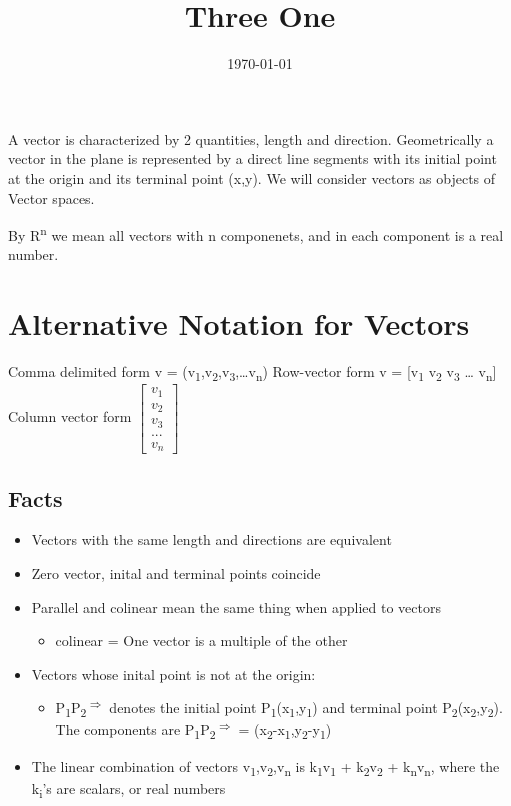 \documentclass[11pt]{article}
\date{\today}
\title{Three One}
\begin{document}
\maketitle
\tableofcontents

A vector is characterized by 2 quantities, length and direction. Geometrically a vector in the plane is represented by a direct line segments with its initial point at the origin and its terminal point (x,y). We will consider vectors as objects of Vector spaces.

By R\textsuperscript{n} we mean all vectors with n componenets, and in each component is a real number.
\section{Alternative Notation for Vectors}
\label{sec:org7187a6c}
Comma delimited form v = (v\textsubscript{1},v\textsubscript{2},v\textsubscript{3},\ldots{}v\textsubscript{n})
Row-vector form v = [v\textsubscript{1} v\textsubscript{2} v\textsubscript{3} \ldots{} v\textsubscript{n}]
Column vector form \(\begin{bmatrix}v_{1}\\v_{2}\\v_{3}\\...\\v_{n}\end{bmatrix}\)
\subsection{Facts}
\label{sec:org103e18a}
\begin{itemize}
\item Vectors with the same length and directions are equivalent
\item Zero vector, inital and terminal points coincide
\item Parallel and colinear mean the same thing when applied to vectors
\begin{itemize}
\item colinear = One vector is a multiple of the other
\end{itemize}
\item Vectors whose inital point is not at the origin:
\begin{itemize}
\item P\textsubscript{1}P\textsubscript{2}\textsuperscript{\(\Rightarrow\)} denotes the initial point P\textsubscript{1}(x\textsubscript{1},y\textsubscript{1}) and terminal point P\textsubscript{2}(x\textsubscript{2},y\textsubscript{2}). The components are P\textsubscript{1}P\textsubscript{2}\textsuperscript{\(\Rightarrow\)} = (x\textsubscript{2}-x\textsubscript{1},y\textsubscript{2}-y\textsubscript{1})
\end{itemize}
\item The linear combination of vectors v\textsubscript{1},v\textsubscript{2},v\textsubscript{n} is k\textsubscript{1}v\textsubscript{1} + k\textsubscript{2}v\textsubscript{2} + k\textsubscript{n}v\textsubscript{n}, where the k\textsubscript{i}'s are scalars, or real numbers
\end{itemize}
\end{document}
